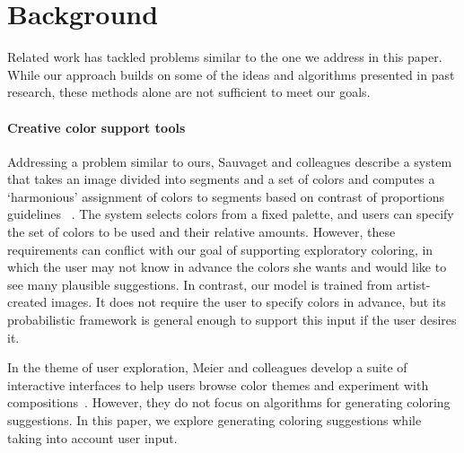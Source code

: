 \section{Background}
\label{sec:background}

Related work has tackled problems similar to the one we address in this paper. While our approach builds on some of the ideas and algorithms presented in past research, these methods alone are not sufficient to meet our goals.

\paragraph{Creative color support tools}
Addressing a problem similar to ours, Sauvaget and colleagues describe a system that takes an image divided into segments and a set of colors and computes a `harmonious' assignment of colors to segments based on contrast of proportions guidelines ~. The system selects colors from a fixed palette, and users can specify the set of colors to be used and their relative amounts. However, these requirements can conflict with our goal of supporting exploratory coloring, in which the user may not know in advance the colors she wants and would like to see many plausible suggestions. In contrast, our model is trained from artist-created images. It does not require the user to specify colors in advance, but its probabilistic framework is general enough to support this input if the user desires it.

In the theme of user exploration, Meier and colleagues develop a suite of interactive interfaces to help users browse color themes and experiment with compositions~. However, they do not focus on algorithms for generating coloring suggestions. In this paper, we explore generating coloring suggestions while taking into account user input.

